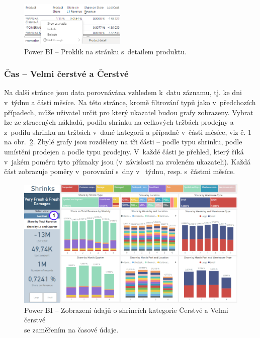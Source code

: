 \begin{figure}[h!]
    \centering
    \captionsetup{justification=centering}
    \includegraphics[width=0.45\textwidth]{obrazky/PBI/detaildrill.png}
    \caption{Power BI -- Proklik na stránku s~detailem produktu.}
    \label{obr:PBI:drilldetail}
\end{figure}

\subsubsection*{Čas -- Velmi čerstvé a Čerstvé}

Na další stránce jsou data porovnávána vzhledem k~datu záznamu, tj. ke dni v~týdnu a části měsíce. Na této stránce, kromě filtrování typů jako v~předchozích případech, může uživatel určit pro který ukazatel budou grafy zobrazeny. Vybrat lze ze ztracených nákladů, podílu shrinku na celkových tržbách prodejny a z~podílu shrinku na tržbách v~dané kategorii a případně v~části měsíce, viz č. 1 na obr.~\ref*{obr:PBI:timeSFF}. Zbylé grafy jsou rozděleny na tři části -- podle typu shrinku, podle umístění prodejen a podle typu prodejny. V~každé části je přehled, který říká v~jakém poměru tyto příznaky jsou (v~závislosti na zvoleném ukazateli). Každá část zobrazuje poměry v~porovnání s~dny v~ týdnu, resp. s~částmi měsíce.

\begin{figure}[h!]
    \centering
    \captionsetup{justification=centering}
    \includegraphics[width=\textwidth]{obrazky/PBI/timeSFF.png}
    \caption{Power BI -- Zobrazení údajů o shrincích kategorie Čerstvé a Velmi čerstvé \\ se zaměřením na časové údaje.}
    \label{obr:PBI:timeSFF}
\end{figure}

